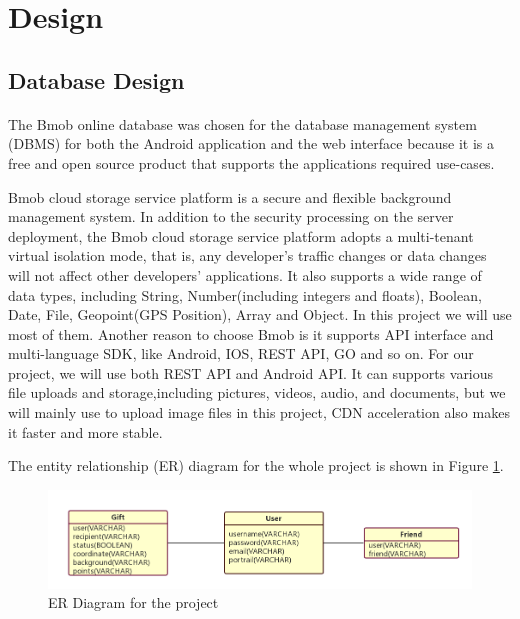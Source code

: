 \section{Design}
\label{sec:Design}

\subsection{Database Design} 
\paragraph{}The Bmob online database was chosen for the database management system (DBMS) for both the Android application and the web interface because it is a free and open source product that supports the applications required use-cases. 
\par Bmob cloud storage service platform is a secure and flexible background management system. In addition to the security processing on the server deployment, the Bmob cloud storage service platform adopts a multi-tenant virtual isolation mode, that is, any developer's traffic changes or data changes will not affect other developers' applications. It also supports a wide range of data types, including String, Number(including integers and floats), Boolean, Date, File, Geopoint(GPS Position), Array and Object. In this project we will use most of them.
Another reason to choose Bmob is it supports API interface and multi-language SDK, like Android, IOS, REST API, GO and so on. For our project, we will use both REST API and Android API. It can supports various file uploads and storage,including pictures, videos, audio, and documents, but we will mainly use to upload image files in this project, CDN acceleration also makes it faster and more stable.
\par The entity relationship (ER) diagram for the whole project is shown in Figure \ref{ERDiagram}.

\begin{figure}[htb]
\centering
\includegraphics[width=.9\textwidth]{section03/assets/ERDiagram.png}
\caption[Short Caption 2]{\label{ERDiagram}ER Diagram for the project}
\end{figure}


